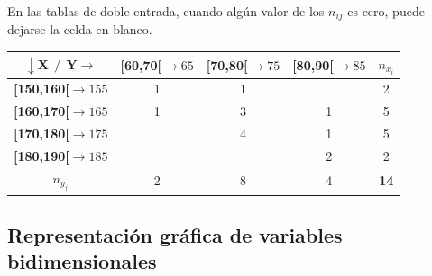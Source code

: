 
En las tablas de doble entrada, cuando algún valor de los $n_{ij}$ es cero, puede dejarse la celda en blanco.

\begin{table}[H]
\centering
\begin{tabular}{c|c|c|c|c}
$\boldsymbol{\downarrow X \ \ / \ \ Y \rightarrow}$ & \textbf{{[}60,70{[}$\to 65$} & \textbf{{[}70,80{[}$\to 75$} & \textbf{{[}80,90{[}$\to 85$} & \textbf{$n_{x_i}$} \\ \hline
\textbf{{[}150,160{[}$\to 155$} & 1 & 1 &   & 2 \\ \hline
\textbf{{[}160,170{[}$\to 165$} & 1 & 3 & 1 & 5 \\ \hline
\textbf{{[}170,180{[}$\to 175$} &   & 4 & 1 & 5 \\ \hline
\textbf{{[}180,190{[}$\to 185$} &   &   & 2 & 2 \\ \hline
\textbf{$n_{y_j}$} & 2 & 8 & 4 & \textbf{14}
\end{tabular}
\end{table}


\subsection{Representación gráfica de variables bidimensionales}

